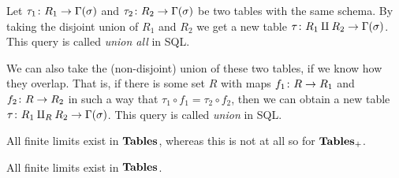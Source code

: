 \documentclass{amsart}
\def\Tables{{\bf Tables}}
\begin{document}
\begin{construction}

Let $\tau_1\colon R_1\rightarrow\Gamma(\sigma)$ and $\tau_2\colon R_2\rightarrow\Gamma(\sigma)$ be two tables with the same schema.  By taking the disjoint union of $R_1$ and $R_2$ we get a new table $\tau\colon R_1\amalg R_2\rightarrow\Gamma(\sigma)$.  This query is called {\em union all} in SQL.  

We can also take the (non-disjoint) union of these two tables, if we know how they overlap.  That is, if there is some set $R$ with maps $f_1\colon R\rightarrow R_1$ and $f_2\colon R\rightarrow R_2$ in such a way that $\tau_1\circ f_1=\tau_2\circ f_2$, then we can obtain a new table $\tau\colon R_1\amalg_RR_2\rightarrow\Gamma(\sigma)$.  This query is called {\em union} in SQL.

\end{construction}

All finite limits exist in $\Tables$, whereas this is not at all so for $\Tables_+$.

\begin{proposition}\label{finite limits exist}

All finite limits exist in $\Tables$.

\end{proposition}
\end{document}
